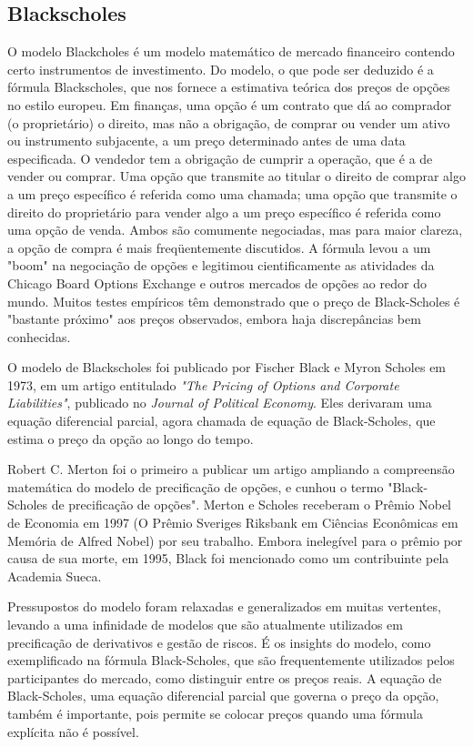 \subsection{Blackscholes}

O modelo Blackcholes é um modelo matemático de mercado financeiro contendo certo instrumentos de investimento. Do modelo, o que pode ser deduzido é a fórmula Blackscholes, que nos fornece a estimativa teórica dos preços de opções no estilo europeu. Em finanças, uma opção é um contrato que dá ao comprador (o proprietário) o direito, mas não a obrigação, de comprar ou vender um ativo ou instrumento subjacente, a um preço determinado antes de uma data especificada. O vendedor tem a obrigação de cumprir a operação, que é a de vender ou comprar. Uma opção que transmite ao titular o direito de comprar algo a um preço específico é referida como uma chamada; uma opção que transmite o direito do proprietário para vender algo a um preço específico é referida como uma opção de venda. Ambos são comumente negociadas, mas para maior clareza, a opção de compra é mais freqüentemente discutidos. A fórmula levou a um "boom" na negociação de opções e legitimou cientificamente as atividades da Chicago Board Options Exchange e outros mercados de opções ao redor do mundo. Muitos testes empíricos têm demonstrado que o preço de Black-Scholes é "bastante próximo" aos preços observados, embora haja discrepâncias bem conhecidas. 


O modelo de Blackscholes foi publicado por Fischer Black e Myron Scholes em 1973, em um artigo entitulado \emph{"The Pricing of Options and Corporate Liabilities"}, publicado no \emph{Journal of Political Economy}. Eles derivaram uma equação diferencial parcial, agora chamada de equação de Black-Scholes, que estima o preço da opção ao longo do tempo. 

Robert C. Merton foi o primeiro a publicar um artigo ampliando a compreensão matemática do modelo de precificação de opções, e cunhou o termo "Black-Scholes de precificação de opções". Merton e Scholes receberam o Prêmio Nobel de Economia em 1997 (O Prêmio Sveriges Riksbank em Ciências Econômicas em Memória de Alfred Nobel) por seu trabalho. Embora inelegível para o prêmio por causa de sua morte, em 1995, Black foi mencionado como um contribuinte pela Academia Sueca. 

Pressupostos do modelo foram relaxadas e generalizados em muitas vertentes, levando a uma infinidade de modelos que são atualmente utilizados em precificação de derivativos e gestão de riscos. É os insights do modelo, como exemplificado na fórmula Black-Scholes, que são frequentemente utilizados pelos participantes do mercado, como distinguir entre os preços reais. A equação de Black-Scholes, uma equação diferencial parcial que governa o preço da opção, também é importante, pois permite se colocar preços quando uma fórmula explícita não é possível. 


